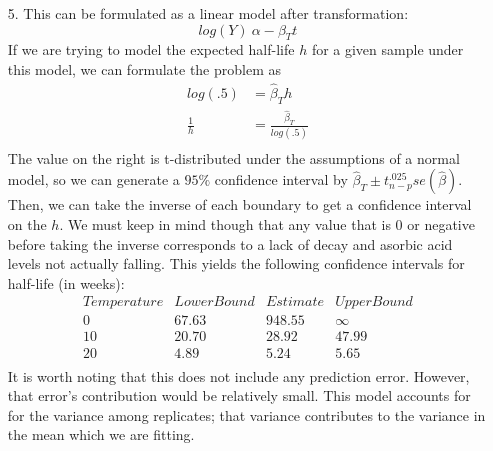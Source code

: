 \documentclass[11pt]{article}
\theoremstyle{definition}
\begin{document}
\begin{itemize}
    \item[5.]
        This can be formulated as a linear model after transformation: 
        \[ log(Y) ~ \alpha - \beta_T t\] 
        If we are trying to model the expected half-life $h$ for a given sample under this model, we can formulate the problem as
        \begin{align*}
            log(.5) &= \hat\beta_Th \\
            \frac{1}{h} &= \frac{\hat\beta_T}{log(.5)}\\
        \end{align*}
        The value on the right is t-distributed under the assumptions of a normal model, so we can generate a $95\%$ confidence interval by $\hat\beta_T\pm t_{n-p}^{.025}se(\hat\beta)$. Then, we can take the inverse of each boundary to get a confidence interval on the $h$. We must keep in mind though that any value that is $0$ or negative before taking the inverse corresponds to a lack of decay and asorbic acid levels not actually falling. This yields the following confidence intervals for half-life (in weeks):
        \[ \begin{array}{cccc} Temperature & Lower Bound & Estimate & Upper Bound \\
                              \hline  
                              0           & 67.63       & 948.55   & \infty      \\
                              10          & 20.70       & 28.92    &  47.99       \\
                              20          & 4.89        & 5.24     & 5.65        \\
                      \end{array} \]
        It is worth noting that this does not include any prediction error. However, that error's contribution would be relatively small. This model accounts for for the variance among replicates; that variance contributes to the variance in the mean which we are fitting.


        
\end{itemize}
\end{document}

